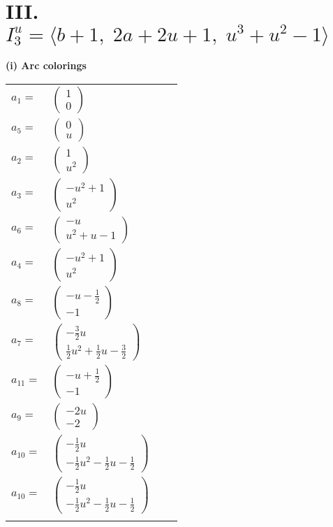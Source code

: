 \documentclass[1p]{elsarticle_modified}
\theoremstyle{definition}
\begin{document}
\centering \section*{III. $I^u_{3}= \langle b+1,\;2 a+2 u+1,\;u^3+u^2-1 \rangle$}
\flushleft \textbf{(i) Arc colorings}\\
\begin{tabular}{m{7pt} m{180pt} m{7pt} m{180pt} }
\flushright $a_{1}=$&$\begin{pmatrix}1\\0\end{pmatrix}$ \\
\flushright $a_{5}=$&$\begin{pmatrix}0\\u\end{pmatrix}$ \\
\flushright $a_{2}=$&$\begin{pmatrix}1\\u^2\end{pmatrix}$ \\
\flushright $a_{3}=$&$\begin{pmatrix}- u^2+1\\u^2\end{pmatrix}$ \\
\flushright $a_{6}=$&$\begin{pmatrix}- u\\u^2+u-1\end{pmatrix}$ \\
\flushright $a_{4}=$&$\begin{pmatrix}- u^2+1\\u^2\end{pmatrix}$ \\
\flushright $a_{8}=$&$\begin{pmatrix}- u-\frac{1}{2}\\-1\end{pmatrix}$ \\
\flushright $a_{7}=$&$\begin{pmatrix}-\frac{3}{2} u\\\frac{1}{2} u^2+\frac{1}{2} u-\frac{3}{2}\end{pmatrix}$ \\
\flushright $a_{11}=$&$\begin{pmatrix}- u+\frac{1}{2}\\-1\end{pmatrix}$ \\
\flushright $a_{9}=$&$\begin{pmatrix}-2 u\\-2\end{pmatrix}$ \\
\flushright $a_{10}=$&$\begin{pmatrix}-\frac{1}{2} u\\-\frac{1}{2} u^2-\frac{1}{2} u-\frac{1}{2}\end{pmatrix}$\\ \flushright $a_{10}=$&$\begin{pmatrix}-\frac{1}{2} u\\-\frac{1}{2} u^2-\frac{1}{2} u-\frac{1}{2}\end{pmatrix}$\\&\end{tabular}
\end{document}
